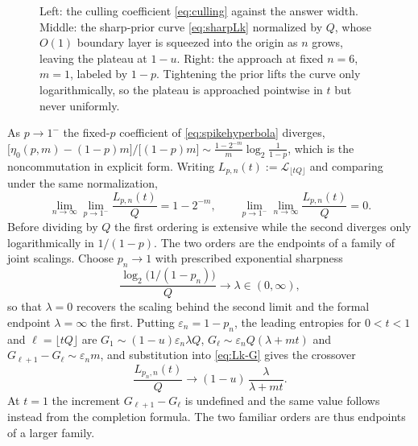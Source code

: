 \documentclass[11pt]{article}
\newif\ifdraftdata
\newcommand{\dataplot}[4]{%
  \ifdraftdata\else\addplot[#1] table[x=#2, y=#3] {#4};\fi}
\newcommand{\datalegend}[1]{\ifdraftdata\else\legend{#1}\fi}
\begin{document}
\begin{figure}[H]
\caption{Left: the culling coefficient \eqref{eq:culling} against the
answer width. Middle: the sharp-prior curve \eqref{eq:sharpLk}
normalized by $Q$, whose $O(1)$ boundary layer is squeezed into the
origin as $n$ grows, leaving the plateau at $1-u$. Right: the
approach at fixed $n = 6$, $m = 1$, labeled by $1-p$. Tightening the
prior lifts the curve only logarithmically, so the plateau is
approached pointwise in $t$ but never uniformly.}
\label{fig:sharpflow}
\end{figure}

As $p \to 1^-$ the fixed-$p$ coefficient of
\eqref{eq:spikehyperbola} diverges,
$\big[\eta_0(p,m)-(1-p)m\big]/\big[(1-p)m\big]
\sim \tfrac{1-2^{-m}}{m}\log_2\tfrac1{1-p}$, which is the
noncommutation in explicit form. Writing
$L_{p,n}(t) := \mathcal L_{\lfloor tQ\rfloor}$ and comparing
under the same normalization,
%
\begin{equation}
  \lim_{n\to\infty}\lim_{p\to1^-}\frac{L_{p,n}(t)}{Q} = 1-2^{-m},
  \qquad
  \lim_{p\to1^-}\lim_{n\to\infty}\frac{L_{p,n}(t)}{Q} = 0 .
  \label{eq:noncommute}
\end{equation}
%
Before dividing by $Q$ the first ordering is extensive while the
second diverges only logarithmically in $1/(1-p)$. The two orders are
the endpoints of a family of joint scalings. Choose $p_n \to 1$ with
prescribed exponential sharpness
%
\begin{equation}
  \frac{\log_2\big(1/(1-p_n)\big)}{Q}\longrightarrow
  \lambda\in(0,\infty),
  \label{eq:lambdascaling}
\end{equation}
%
so that $\lambda = 0$ recovers the scaling behind the second limit and
the formal endpoint $\lambda = \infty$ the first. Putting
$\varepsilon_n = 1-p_n$, the leading entropies for $0 < t < 1$ and
$\ell = \lfloor tQ\rfloor$ are
$G_1 \sim (1-u)\varepsilon_n\lambda Q$,
$G_\ell \sim \varepsilon_n Q(\lambda + mt)$ and
$G_{\ell+1}-G_\ell \sim \varepsilon_n m$, and substitution into
\eqref{eq:Lk-G} gives the crossover
%
\begin{equation}
  \frac{L_{p_n,n}(t)}{Q}
  \longrightarrow (1-u)\,\frac{\lambda}{\lambda + mt}. 
  \label{eq:crossover}
\end{equation}
%
At $t = 1$ the increment $G_{\ell+1}-G_\ell$ is undefined and the same value
follows instead from the completion formula. The two familiar orders
are thus endpoints of a larger family.
\end{document}
